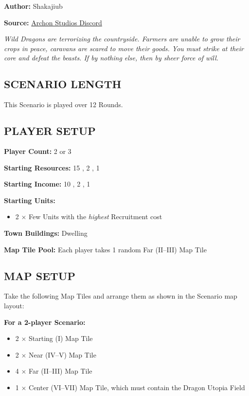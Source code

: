 
\begin{multicols*}{2}

\textbf{Author:} Shakajiub

\textbf{Source:} \href{https://discord.com/channels/740870068178649108/1237891632448278618}{Archon Studios Discord}

\textit{Wild Dragons are terrorizing the countryside.
Farmers are unable to grow their crops in peace, caravans are scared to move their goods.
You must strike at their core and defeat the beasts.
If by nothing else, then by sheer force of will.}

\subsection*{\MakeUppercase{Scenario Length}}
This Scenario is played over 12 Rounds.

\subsection*{\MakeUppercase{Player Setup}}
\textbf{Player Count:} 2 or 3

\textbf{Starting Resources:} 15 , 2 , 1 

\textbf{Starting Income:} 10 , 2 , 1 

\textbf{Starting Units:}
\begin{itemize}
  \item 2 × Few  Units with the \textit{highest} Recruitment cost
\end{itemize}

\textbf{Town Buildings:}  Dwelling

\textbf{Map Tile Pool:} Each player takes 1 random Far (II--III) Map Tile

\subsection*{\MakeUppercase{Map Setup}}
Take the following Map Tiles and arrange them as shown in the Scenario map layout:

\textbf{For a 2-player Scenario:}
\begin{itemize}
  \item 2 × Starting (I) Map Tile
  \item 2 × Near (IV--V) Map Tile
  \item 4 × Far (II--III) Map Tile
  \item 1 × Center (VI--VII) Map Tile, which must contain the Dragon Utopia Field
\end{itemize}
\vspace*{\fill}\columnbreak


\end{multicols*}
